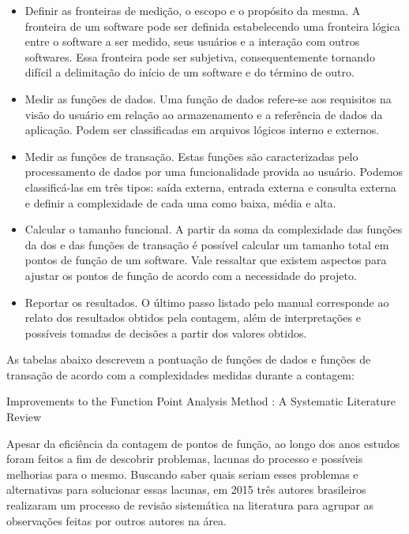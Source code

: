 \begin{itemize}

\item Definir as fronteiras de medição, o escopo e o propósito da mesma. A fronteira de um software pode ser definida estabelecendo uma fronteira lógica entre o software a ser medido, seus usuários e a interação com outros softwares. Essa fronteira pode ser subjetiva, consequentemente tornando difícil a delimitação do início de um software e do término de outro.

\item Medir as funções de dados. Uma função de dados refere-se aos requisitos na visão do usuário em relação ao armazenamento e a referência de dados da aplicação. Podem ser classificadas em arquivos lógicos interno e externos.

\item Medir as funções de transação. Estas funções são caracterizadas pelo processamento de dados por uma funcionalidade provida ao usuário. Podemos classificá-las em três tipos: saída externa, entrada externa e consulta externa e definir a complexidade de cada uma como baixa, média e alta.

\item Calcular o tamanho funcional. A partir da soma da complexidade das funções da dos e das funções de transação é possível calcular um tamanho total em pontos de função de um software. Vale ressaltar que existem aspectos para ajustar os pontos de função de acordo com a necessidade do projeto.

\item Reportar os resultados. O último passo listado pelo manual corresponde ao relato dos resultados obtidos pela contagem, além de interpretações e possíveis tomadas de decisões a partir dos valores obtidos.

\end{itemize}

As tabelas abaixo descrevem a pontuação de funções de dados e funções de transação de acordo com a complexidades medidas durante a contagem:


Improvements to the Function Point Analysis Method : A Systematic Literature Review


Apesar da eficiência da contagem de pontos de função, ao longo dos anos estudos foram feitos a fim de descobrir problemas, lacunas do processo e possíveis melhorias para o mesmo. Buscando saber quais seriam esses problemas e alternativas para solucionar essas lacunas, em 2015 três autores brasileiros realizaram um processo de revisão sistemática na literatura para agrupar as observações feitas por outros autores na área.

